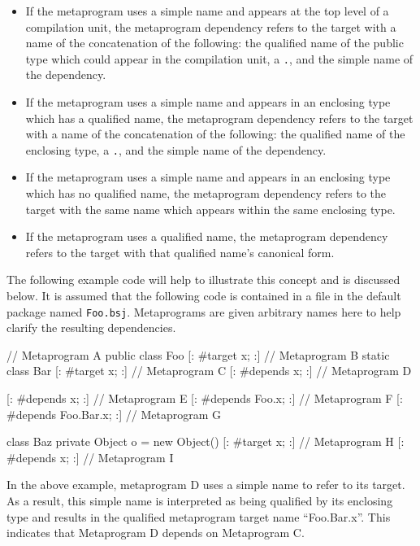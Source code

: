 \documentclass[a4paper,10pt]{report}
\newenvironment{code}{\small\verbatim}{\endverbatim}
\begin{document}
\begin{itemize}
    \item If the metaprogram uses a simple name and appears at the top level of a compilation unit, the metaprogram dependency refers to the target with a name of the concatenation of the following: the qualified name of the public type which could appear in the compilation unit, a \verb`.`, and the simple name of the dependency.
    \item If the metaprogram uses a simple name and appears in an enclosing type which has a qualified name, the metaprogram dependency refers to the target with a name of the concatenation of the following: the qualified name of the enclosing type, a \verb`.`, and the simple name of the dependency.
    \item If the metaprogram uses a simple name and appears in an enclosing type which has no qualified name, the metaprogram dependency refers to the target with the same name which appears within the same enclosing type.
    \item If the metaprogram uses a qualified name, the metaprogram dependency refers to the target with that qualified name's canonical form.
\end{itemize}

The following example code will help to illustrate this concept and is discussed below.  It is assumed that the following code is contained in a file in the default package named \verb`Foo.bsj`.  Metaprograms are given arbitrary names here to help clarify the resulting dependencies.

\begin{code}
    [: #target x; :] // Metaprogram A
    public class Foo
    {
        [: #target x; :] // Metaprogram B
        static class Bar
        {
            [: #target x; :] // Metaprogram C
            [: #depends x; :] // Metaprogram D
        }
    }
    
    [: #depends x; :] // Metaprogram E
    [: #depends Foo.x; :] // Metaprogram F
    [: #depends Foo.Bar.x; :] // Metaprogram G

    class Baz
    {
        private Object o = new Object(){
            [: #target x; :] // Metaprogram H
            [: #depends x; :] // Metaprogram I
        }
    }
\end{code}

In the above example, metaprogram D uses a simple name to refer to its target.  As a result, this simple name is interpreted as being qualified by its enclosing type and results in the qualified metaprogram target name ``Foo.Bar.x''.  This indicates that Metaprogram D depends on Metaprogram C.
\end{document}
